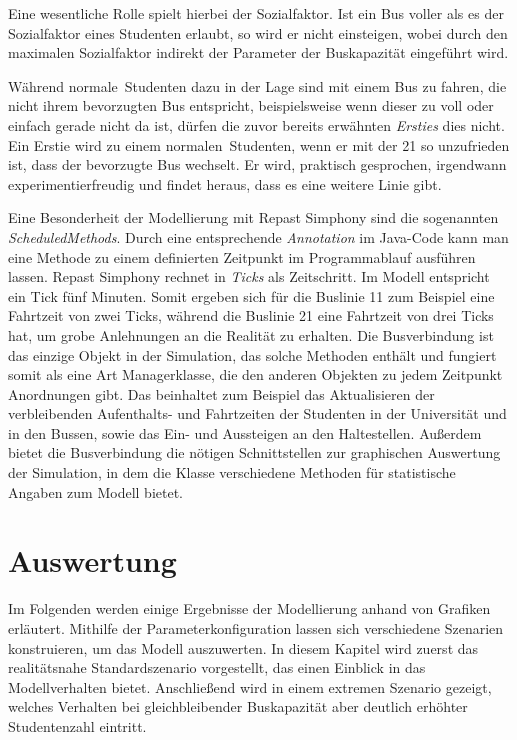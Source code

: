 \documentclass[12pt,a4paper]{scrartcl}
\begin{document}
Eine wesentliche Rolle spielt hierbei der Sozialfaktor. Ist ein Bus voller als es der Sozialfaktor eines Studenten erlaubt, so wird er nicht einsteigen, wobei durch den maximalen Sozialfaktor indirekt der Parameter der Buskapazität eingeführt wird.

Während \glqq normale\grqq~Studenten dazu in der Lage sind mit einem Bus zu fahren, die nicht ihrem bevorzugten Bus entspricht, beispielsweise wenn dieser zu voll oder einfach gerade nicht da ist, dürfen die zuvor bereits erwähnten \textit{Ersties} dies nicht. Ein Erstie wird zu einem \glqq normalen\grqq~Studenten, wenn er mit der 21 so unzufrieden ist, dass der bevorzugte Bus wechselt. Er wird, praktisch gesprochen, irgendwann experimentierfreudig und findet heraus, dass es eine weitere Linie gibt.

Eine Besonderheit der Modellierung mit Repast Simphony sind die sogenannten \textit{ScheduledMethods}. Durch eine entsprechende \textit{Annotation} im Java-Code kann man eine Methode zu einem definierten Zeitpunkt im Programmablauf ausführen lassen. Repast Simphony rechnet in \textit{Ticks} als Zeitschritt. Im Modell entspricht ein Tick fünf Minuten. Somit ergeben sich für die Buslinie 11 zum Beispiel eine Fahrtzeit von zwei Ticks, während die Buslinie 21 eine Fahrtzeit von drei Ticks hat, um grobe Anlehnungen an die Realität zu erhalten. Die Busverbindung ist das einzige Objekt in der Simulation, das solche Methoden enthält und fungiert somit als eine Art Managerklasse, die den anderen Objekten zu jedem Zeitpunkt Anordnungen gibt. Das beinhaltet zum Beispiel das Aktualisieren der verbleibenden Aufenthalts- und Fahrtzeiten der Studenten in der Universität und in den Bussen, sowie das Ein- und Aussteigen an den Haltestellen. Außerdem bietet die Busverbindung die nötigen Schnittstellen zur graphischen Auswertung der Simulation, in dem die Klasse verschiedene Methoden für statistische Angaben zum Modell bietet. 

\section{Auswertung}\label{erg}
Im Folgenden werden einige Ergebnisse der Modellierung anhand von Grafiken erläutert. Mithilfe der Parameterkonfiguration lassen sich verschiedene Szenarien konstruieren, um das Modell auszuwerten. In diesem Kapitel wird zuerst das realitätsnahe Standardszenario vorgestellt, das einen Einblick in das Modellverhalten bietet. Anschließend wird in einem extremen Szenario gezeigt, welches Verhalten bei gleichbleibender Buskapazität aber deutlich erhöhter Studentenzahl eintritt.
\end{document}
